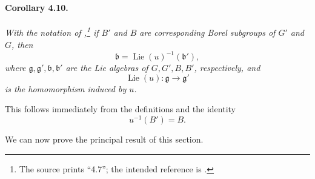 \paragraph{\textbf{Corollary 4.10.}}
{\itshape With the notation of ,\footnote{The source prints
``4.7''; the intended reference is .} if \(B'\) and \(B\) are
corresponding Borel subgroups of \(G'\) and \(G\), then
\[
  \mathfrak b=\operatorname{Lie}(u)^{-1}(\mathfrak b'),
\]
where \(\mathfrak g,\mathfrak g',\mathfrak b,\mathfrak b'\) are
the Lie algebras of \(G,G',B,B'\), respectively, and
\[
  \operatorname{Lie}(u)\colon\mathfrak g\longrightarrow\mathfrak g'
\]
is the homomorphism induced by \(u\).}

This follows immediately from the definitions and the identity
\[
  u^{-1}(B')=B.
\]

We can now prove the principal result of this section.
